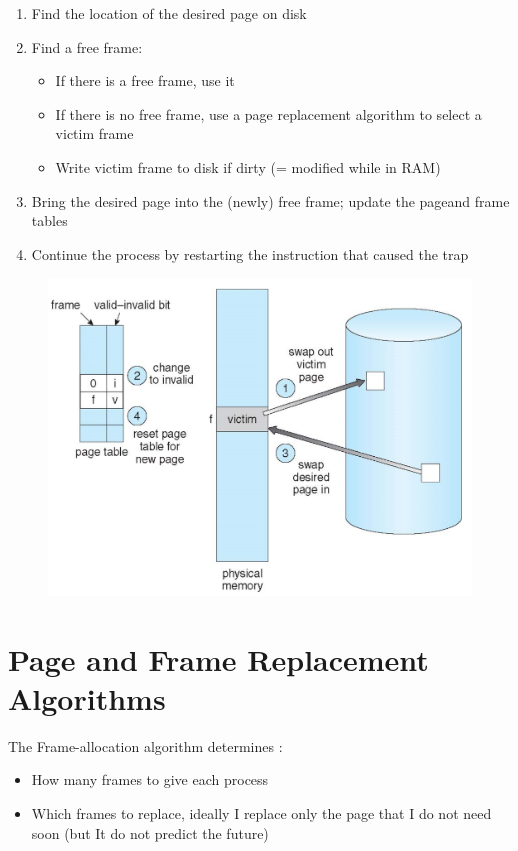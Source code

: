 \begin{enumerate}
    \item Find the location of the desired page on disk
    \item Find a free frame:
    \begin{itemize}
        \item[]  If there is a free frame, use it
        \item[]  If there is no free frame, use a page replacement algorithm to  select a victim frame
        \item[]  Write victim frame to disk if dirty (= modified while in RAM)
    \end{itemize}
    \item Bring the desired page into the (newly) free frame; update the pageand frame tables
    \item Continue the process by restarting the instruction that caused the trap
\end{enumerate}

\begin{figure}[htbp]
    \centering
    \includegraphics[width=0.65\linewidth]{img/mghj.png}
\end{figure}

\section{Page and Frame Replacement Algorithms}

The Frame-allocation algorithm determines :

\begin{itemize}
    \item[] How many frames to give each process
    \item[] Which frames to replace, ideally I replace only the page that I do not need soon (but It do not predict the future)
\end{itemize}


